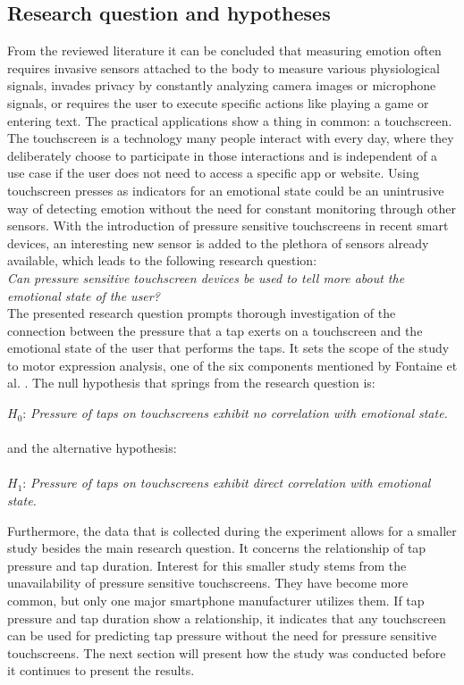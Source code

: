 \documentclass{sigchi}
\begin{document}

\subsection{Research question and hypotheses}
From the reviewed literature it can be concluded that measuring emotion often requires invasive sensors attached to the body to measure various physiological signals, invades privacy by constantly analyzing camera images or microphone signals, or requires the user to execute specific actions like playing a game or entering text. The practical applications show a thing in common: a touchscreen. The touchscreen is a technology many people interact with every day, where they deliberately choose to participate in those interactions and is independent of a use case if the user does not need to access a specific app or website. Using touchscreen presses as indicators for an emotional state could be an unintrusive way of detecting emotion without the need for constant monitoring through other sensors. With the introduction of pressure sensitive touchscreens in recent smart devices, an interesting new sensor is added to the plethora of sensors already available, which leads to the following research question:\\

\textit{Can pressure sensitive touchscreen devices be used to tell more about the emotional state of the user?}\\

The presented research question prompts thorough investigation of the connection between the pressure that a tap exerts on a touchscreen and the emotional state of the user that performs the taps. It sets the scope of the study to motor expression analysis, one of the six components mentioned by Fontaine et al. \cite{Fontaine2007}. The null hypothesis that springs from the research question is:

$H_0$: \textit{Pressure of taps on touchscreens exhibit no correlation with emotional state.}
\\\\and the alternative hypothesis:\\\\
$H_1$: \textit{Pressure of taps on touchscreens exhibit direct correlation with emotional state.}

Furthermore, the data that is collected during the experiment allows for a smaller study besides the main research question. It concerns the relationship of tap pressure and tap duration. Interest for this smaller study stems from the unavailability of pressure sensitive touchscreens. They have become more common, but only one major smartphone manufacturer utilizes them. If tap pressure and tap duration show a relationship, it indicates that any touchscreen can be used for predicting tap pressure without the need for pressure sensitive touchscreens. The next section will present how the study was conducted before it continues to present the results.
\end{document}

